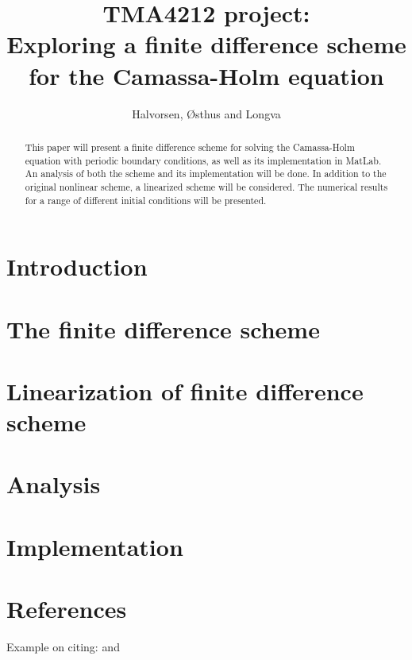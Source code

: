 \documentclass{article}
\title{TMA4212 project: \\ Exploring a finite difference scheme for the Camassa-Holm equation}
\author{Halvorsen, Østhus and Longva}
\begin{document}
\maketitle

\begin{abstract}
This paper will present a finite difference scheme for solving the Camassa-Holm equation with periodic boundary conditions, as well as its implementation in MatLab. An analysis of both the scheme and its implementation will be done. In addition to the original nonlinear scheme, a linearized scheme will be considered. The numerical results for a range of different initial conditions will be presented. 
\end{abstract}

\newpage

\section*{Introduction}


\newpage

\section*{The finite difference scheme}


\newpage

\section*{Linearization of finite difference scheme}


\newpage

\section*{Analysis}


\section*{Implementation}


\section*{References}
Example on citing: \cite{holden2006convergence} and \cite{dahlby2007geometric}
{}

\end{document}
